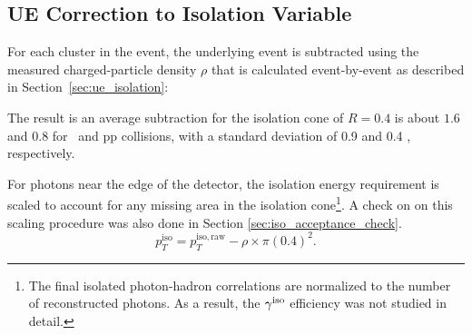 
\subsection{UE Correction to Isolation Variable}
\label{sec:ue_correction_isolation}
For each cluster in the event, the underlying event is subtracted using the measured charged-particle density $\rho$ that is calculated event-by-event as described in Section~\ref{sec:ue_isolation}:


The result is an average subtraction for the isolation cone of {$R=0.4$} is about {$1.6$ \GeVc} and {$0.8$ \GeVc} for \pPb~and pp collisions, with a standard deviation of {0.9 \GeVc} and {0.4 \GeVc}, respectively.  

 
For photons near the edge of the detector, the isolation energy requirement is scaled to account for any missing area in the isolation cone\footnote{The final isolated photon-hadron correlations are normalized to the number of reconstructed photons. As a result, the $\gamma^\mathrm{iso}$ efficiency was not studied in detail.}. A check on on this scaling procedure was also done in Section \ref{sec:iso_acceptance_check}. 
\begin{equation}
p_T^\mathrm{iso} = p_T^\mathrm{iso,raw} - \rho\times\pi(0.4)^{2}.
\end{equation}

